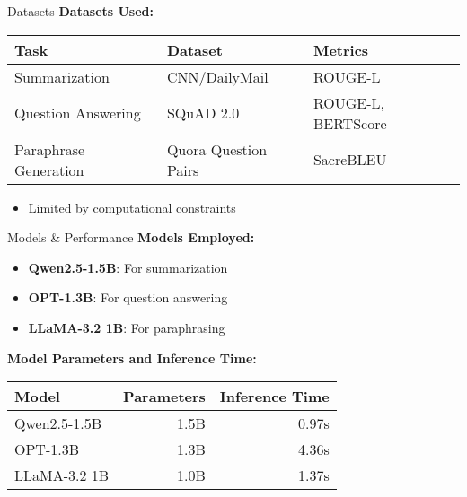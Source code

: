 \documentclass{beamer}
\begin{document}
\begin{frame}{Datasets}
\textbf{Datasets Used:}
\begin{scriptsize}
\begin{tabular}{@{}lll@{}}
\toprule
\textbf{Task} & \textbf{Dataset} & \textbf{Metrics} \\
\midrule
Summarization & CNN/DailyMail & ROUGE-L \\
Question Answering & SQuAD 2.0 & ROUGE-L, BERTScore \\
Paraphrase Generation & Quora Question Pairs & SacreBLEU \\
\bottomrule
\end{tabular}
\end{scriptsize}

\vspace{1em} %

\begin{itemize}
    \item Limited by computational constraints
\end{itemize}
\end{frame}

\begin{frame}{Models & Performance}
\textbf{Models Employed:}
\begin{itemize}
    \item \textbf{Qwen2.5-1.5B}: For summarization
    \item \textbf{OPT-1.3B}: For question answering
    \item \textbf{LLaMA-3.2 1B}: For paraphrasing
\end{itemize}

\vspace{1em} %

\textbf{Model Parameters and Inference Time:}
\begin{scriptsize}
\begin{tabular}{@{}lrr@{}}
\toprule
\textbf{Model} & \textbf{Parameters} & \textbf{Inference Time} \\
\midrule
Qwen2.5-1.5B & 1.5B & 0.97s \\
OPT-1.3B & 1.3B & 4.36s \\
LLaMA-3.2 1B & 1.0B & 1.37s \\
\bottomrule
\end{tabular}
\end{scriptsize}
\end{frame}
\end{document}
